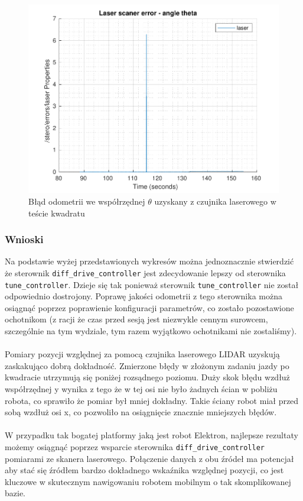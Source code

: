 \documentclass{mwrep}
\begin{document}
\begin{figure}[H]
	\centering
	\includegraphics[scale=0.85]{./figures/pro1/square_tune/square_tune_laser_theta.pdf}
	\caption{Błąd odometrii we współrzędnej $\theta$ uzyskany z czujnika laserowego w teście kwadratu}
\end{figure}
\vspace{0.8cm}

\subsubsection{Wnioski}
Na podstawie wyżej przedstawionych wykresów można jednoznacznie stwierdzić że sterownik \texttt{diff\_{}drive\_{}controller}
jest zdecydowanie lepszy od sterownika \texttt{tune\_{}controller}. Dzieje się tak ponieważ sterownik
\texttt{tune\_{}controller} nie został odpowiednio dostrojony. Poprawę jakości odometrii z tego sterownika
można osiągnąć poprzez poprawienie konfiguracji parametrów, co zostało pozostawione ochotnikom (z racji 
że czas przed sesją jest niezwykle cennym surowcem, szczególnie na tym wydziale, tym razem wyjątkowo ochotnikami nie zostaliśmy).\\
\\
\indent{} Pomiary pozycji względnej za pomocą czujnika laserowego LIDAR uzyskują zaskakująco dobrą 
dokładność. Zmierzone błędy w złożonym zadaniu jazdy po kwadracie utrzymują się poniżej rozsądnego poziomu.
Duży skok błędu wzdłuż współrzędnej y wynika z tego że w tej osi nie było żadnych ścian w pobliżu robota,
co sprawiło że pomiar był mniej dokładny. Takie ściany robot miał przed sobą wzdłuż osi x, co pozwoliło na 
osiągnięcie znacznie mniejszych błędów. \\
\\
\indent{} W przypadku tak bogatej platformy jaką jest robot Elektron, najlepsze rezultaty możemy osiągnąć poprzez 
wsparcie sterownika \texttt{diff\_{}drive\_{}controller} pomiarami ze skanera laserowego. Połączenie 
danych z obu źródeł ma potencjał aby stać się źródłem bardzo dokładnego wskaźnika względnej pozycji, co 
jest kluczowe w skutecznym nawigowaniu robotem mobilnym o tak skomplikowanej bazie.
\end{document}
